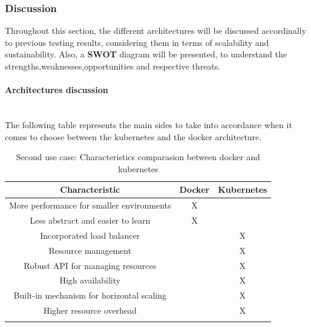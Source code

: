 \subsubsection{Discussion}

Throughout this section, the different architectures will be
discussed accordinally to previous testing results, considering them in terms of scalability and sustainability. Also, a \textbf{SWOT} diagram will be presented, to understand the strengths,weaknesses,opportunities and respective threats.

\paragraph{Architectures discussion}\mbox{}\\

The following table represents the main sides to take into accordance when it comes to choose between the kubernetes and the docker architecture.

\begin{longtable}{| c | c | c |}
	\hline
	 \textbf{Characteristic} & \textbf{Docker} & \textbf{Kubernetes} \\ \hline
	
	More performance for smaller environments & X & \\ \hline
	
    Less abstract and easier to learn & X & \\ \hline
	
	Incorporated load balancer &  & X \\ \hline
	
	Resource management &  & X \\ \hline
	
	Robust API for managing resources &  & X \\ \hline
	
	High availability &  & X \\ \hline
	
	Built-in mechanism for horizontal scaling &  & X \\ \hline
	
	Higher resource overhead &  & X \\ \hline
	
	\caption{Second use case: Characteristics comparasion between docker and kubernetes} \label{tab:activity_schedule} 
\end{longtable}

